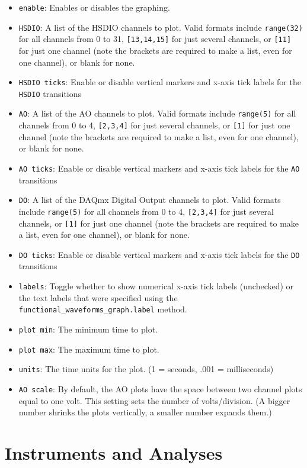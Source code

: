 \documentclass[pdftex,11pt,letterpaper]{article}
\begin{document}
\begin{itemize}
\item \texttt{enable}: Enables or disables the graphing.
\item \texttt{HSDIO}: A list of the HSDIO channels to plot.  Valid formats include \texttt{range(32)} for all channels from 0 to 31, \texttt{[13,14,15]} for just several channels, or \texttt{[11]} for just one channel (note the brackets are required to make a list, even for one channel), or blank for none.
\item \texttt{HSDIO ticks}:  Enable or disable vertical markers and x-axis tick labels for the \texttt{HSDIO} transitions
\item \texttt{AO}: A list of the AO channels to plot.  Valid formats include \texttt{range(5)} for all channels from 0 to 4, \texttt{[2,3,4]} for just several channels, or \texttt{[1]} for just one channel (note the brackets are required to make a list, even for one channel), or blank for none.
\item \texttt{AO ticks}:  Enable or disable vertical markers and x-axis tick labels for the \texttt{AO} transitions
\item \texttt{DO}: A list of the DAQmx Digital Output channels to plot.  Valid formats include \texttt{range(5)} for all channels from 0 to 4, \texttt{[2,3,4]} for just several channels, or \texttt{[1]} for just one channel (note the brackets are required to make a list, even for one channel), or blank for none.
\item \texttt{DO ticks}: Enable or disable vertical markers and x-axis tick labels for the \texttt{DO} transitions
\item \texttt{labels}: Toggle whether to show numerical x-axis tick labels (unchecked) or the text labels that were specified using the \texttt{functional\_waveforms\_graph.label} method.
\item \texttt{plot min}: The minimum time to plot.
\item \texttt{plot max}: The maximum time to plot.
\item \texttt{units}: The time units for the plot.  (1 = seconds, .001 = milliseconds)
\item \texttt{AO scale}:  By default, the AO plots have the space between two channel plots equal to one volt.  This setting sets the number of volts/division.  (A bigger number shrinks the plots vertically, a smaller number expands them.)
\end{itemize}

\section{Instruments and Analyses}
\end{document}
